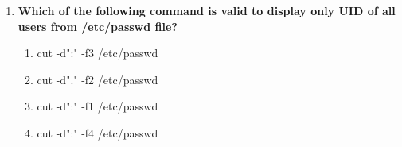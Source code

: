\begin{flushleft}
\begin{enumerate}
		\bigskip
		\bigskip
		\item \textbf{Which of the following command is valid to display only UID of all users from \textbf{/etc/passwd} file?}
		\begin{enumerate}[label=(\alph*)]
			\item cut -d":" -f3 /etc/passwd  %
 			\item cut -d"." -f2 /etc/passwd
			\item cut -d":" -f1 /etc/passwd
			\item cut -d":" -f4 /etc/passwd
		\end{enumerate}
	\end{enumerate}
	
	
\end{flushleft}

\newpage

